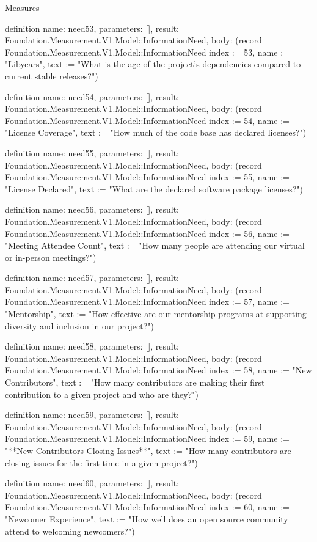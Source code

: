 \begin{lexlean}{Measures}
\begin{semanticmodule}
definition{
  name: need53,
  parameters: [],
  result: Foundation.Measurement.V1.Model::InformationNeed,
  body: (record Foundation.Measurement.V1.Model::InformationNeed {index := 53, name := "Libyears", text := "What is the age of the project’s dependencies compared to current stable releases?"})
}

definition{
  name: need54,
  parameters: [],
  result: Foundation.Measurement.V1.Model::InformationNeed,
  body: (record Foundation.Measurement.V1.Model::InformationNeed {index := 54, name := "License Coverage", text := "How much of the code base has declared licenses?"})
}

definition{
  name: need55,
  parameters: [],
  result: Foundation.Measurement.V1.Model::InformationNeed,
  body: (record Foundation.Measurement.V1.Model::InformationNeed {index := 55, name := "License Declared", text := "What are the declared software package licenses?"})
}

definition{
  name: need56,
  parameters: [],
  result: Foundation.Measurement.V1.Model::InformationNeed,
  body: (record Foundation.Measurement.V1.Model::InformationNeed {index := 56, name := "Meeting Attendee Count", text := "How many people are attending our virtual or in-person meetings?"})
}

definition{
  name: need57,
  parameters: [],
  result: Foundation.Measurement.V1.Model::InformationNeed,
  body: (record Foundation.Measurement.V1.Model::InformationNeed {index := 57, name := "Mentorship", text := "How effective are our mentorship programs at supporting diversity and inclusion in our project?"})
}

definition{
  name: need58,
  parameters: [],
  result: Foundation.Measurement.V1.Model::InformationNeed,
  body: (record Foundation.Measurement.V1.Model::InformationNeed {index := 58, name := "New Contributors", text := "How many contributors are making their first contribution to a given project and who are they?"})
}

definition{
  name: need59,
  parameters: [],
  result: Foundation.Measurement.V1.Model::InformationNeed,
  body: (record Foundation.Measurement.V1.Model::InformationNeed {index := 59, name := "**New Contributors Closing Issues**", text := "How many contributors are closing issues for the first time in a given project?"})
}

definition{
  name: need60,
  parameters: [],
  result: Foundation.Measurement.V1.Model::InformationNeed,
  body: (record Foundation.Measurement.V1.Model::InformationNeed {index := 60, name := "Newcomer Experience", text := "How well does an open source community attend to welcoming newcomers?"})
}


\end{semanticmodule}
\end{lexlean}
